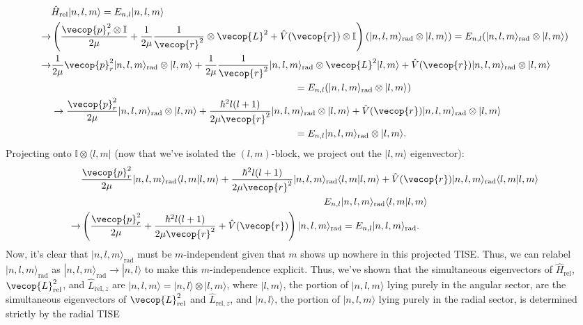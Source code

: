 \begin{align*}
    &\hat{H}_\text{rel}|n,l,m\rangle = E_{n,l}|n,l,m\rangle\\
    \rightarrow&\left(\frac{\vecop{p}^2_r\otimes\mathbb{I}}{2\mu}+\frac{1}{2\mu}\frac{1}{\vecop{r}^2}\otimes\vecop{L}^2+\hat{V}(\vecop{r})\otimes\mathbb{I}\right)\left(|n,l,m\rangle_\text{rad}\otimes|l,m\rangle  \right) = E_{n,l}(|n,l,m\rangle_\text{rad}\otimes|l,m\rangle)\\
    \rightarrow&\frac{1}{2\mu}\vecop{p}^2_r|n,l,m\rangle_\text{rad}\otimes |l,m\rangle+\frac{1}{2\mu}\frac{1}{\vecop{r}^2}|n,l,m\rangle_\text{rad}\otimes \vecop{L}^2|l,m\rangle + \hat{V}(\vecop{r})|n,l,m\rangle_\text{rad}\otimes|l,m\rangle\\
    &\hspace{250pt}=E_{n,l}(|n,l,m\rangle_\text{rad}\otimes|l,m\rangle)\\
    &\rightarrow \frac{\vecop{p}^2_r}{2\mu}|n,l,m\rangle_\text{rad}\otimes|l,m\rangle + \frac{\hbar^2l(l+1)}{2\mu\vecop{r}^2}|n,l,m\rangle_\text{rad}\otimes|l,m\rangle + \hat{V}(\vecop{r})|n,l,m\rangle_\text{rad}\otimes|l,m\rangle\\
    &\hspace{250pt}=E_{n,l}|n,l,m\rangle_\text{rad}\otimes|l,m\rangle.
\end{align*}
Projecting onto $\mathbb{I}\otimes\langle l,m|$ (now that we've isolated the $(l,m)$-block, we project out the $|l,m\rangle$ eigenvector):
\begin{align*}
    &\frac{\vecop{p}^2_r}{2\mu}|n,l,m\rangle_\text{rad}\langle l,m|l,m\rangle + \frac{\hbar^2l(l+1)}{2\mu\vecop{r}^2}|n,l,m\rangle_\text{rad}\langle l,m|l,m\rangle + \hat{V}(\vecop{r})|n,l,m\rangle_\text{rad}\langle l,m|l,m\rangle\\
    &\hspace{250pt}E_{n,l}|n,l,m\rangle_\text{rad}\langle l,m|l,m\rangle\\
    \rightarrow&\left(\frac{\vecop{p}^2_r}{2\mu} +\frac{\hbar^2l(l+1)}{2\mu\vecop{r}^2}+\hat{V}(\vecop{r}) \right)|n,l,m\rangle_\text{rad} = E_{n,l}|n,l,m\rangle_\text{rad}.
\end{align*}
Now, it's clear that $|n,l,m\rangle_\text{rad}$ must be $m$-independent given that $m$ shows up nowhere in this projected TISE. Thus, we can relabel $|n,l,m\rangle_\text{rad}$ as $|n,l,m\rangle_\text{rad}\rightarrow|n,l\rangle$ to make this $m$-independence explicit. Thus, we've shown that the simultaneous eigenvectors of $\hat{H}_\text{rel}$, $\vecop{L}_\text{rel}^2$, and $\hat{L}_{\text{rel},z}$ are $|n,l,m\rangle=|n,l\rangle\otimes|l,m\rangle$, where $|l,m\rangle$, the portion of $|n,l,m\rangle$ lying purely in the angular sector, are the simultaneous eigenvectors of $\vecop{L}^2_\text{rel}$ and $\hat{L}_{\text{rel},z}$, and $|n,l\rangle$, the portion of $|n,l,m\rangle$ lying purely in the radial sector, is determined strictly by the radial TISE%
